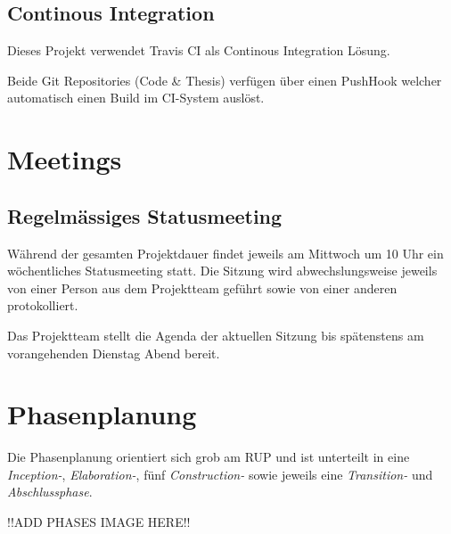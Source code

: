 \subsection{Continous Integration}
Dieses Projekt verwendet Travis CI als Continous Integration Lösung.

Beide Git Repositories (Code \& Thesis) verfügen über einen \gls{PushHook} welcher automatisch einen Build im CI-System auslöst.



\section{Meetings}
\subsection{Regelmässiges Statusmeeting}
Während der gesamten Projektdauer findet jeweils am Mittwoch um 10 Uhr ein wöchentliches Statusmeeting statt. Die Sitzung wird abwechslungsweise jeweils von einer Person aus dem Projektteam geführt sowie von einer anderen protokolliert.

Das Projektteam stellt die Agenda der aktuellen Sitzung bis spätenstens am vorangehenden Dienstag Abend bereit.

\section{Phasenplanung}
Die Phasenplanung orientiert sich grob am \gls{RUP} und ist unterteilt in eine \emph{Inception-}, \emph{Elaboration-}, fünf \emph{Construction-} sowie jeweils eine \emph{Transition-} und \emph{Abschlussphase}.


!!ADD PHASES IMAGE HERE!!


